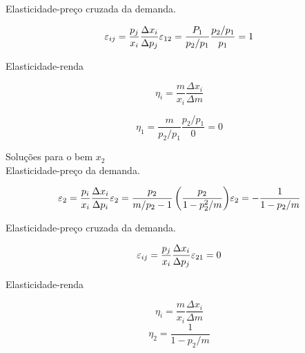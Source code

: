 \documentclass[a4paper, 12pt]{article} %
\begin{document}
\begin{flushleft}
\begin{center}
Elasticidade-preço cruzada da demanda.
\end{center}

\begin{equation}
\varepsilon_{ij} = \dfrac{p_{j}}{x_{i}} \dfrac{\Delta x_{i}}{\Delta p_{j}}
$$\\$$
\varepsilon_{12} = \dfrac{P_{1}}{p_{2}/p_{1}} \dfrac{p_{2}/p_{1}}{p_{1}} = 1
\end{equation}

\begin{center}
Elasticidade-renda 
\end{center}

\begin{equation}
\eta_{i} = \dfrac{m}{x_{i}} \dfrac{\Delta x_{i}}{\Delta m}
\end{equation}

\begin{equation}
\eta_{1} = \dfrac{m}{p_{2}/p_{1}} \dfrac{p_{2}/p_{1}}{0}  = 0
\end{equation}

\begin{center}
	Soluções para o bem $x_{2}$
	\\
	Elasticidade-preço da demanda.
\end{center}

\begin{equation}
\varepsilon_{2} = \dfrac{p_{i}}{x_{i}} \dfrac{ \Delta x_{i}}{\Delta p_{i}}
$$\\$$
\varepsilon_{2} = \dfrac{p_{2}}{m/p_{2}-1} \left( \dfrac{p_{2}}{1-p_{2}^{2}/m} \right)
$$\\$$
\varepsilon_{2} = - \dfrac{1}{1-p_{2}/m}
\end{equation}

\begin{center}
	Elasticidade-preço cruzada da demanda.
\end{center}

\begin{equation}
\varepsilon_{ij} = \dfrac{p_{j}}{x_{i}} \dfrac{\Delta x_{i}}{\Delta p_{j}}
$$\\$$
\varepsilon_{21} = 0
\end{equation}

\begin{center}
	Elasticidade-renda 
\end{center}

\begin{equation}
\eta_{i} = \dfrac{m}{x_{i}} \dfrac{\Delta x_{i}}{\Delta m}
\end{equation}
\begin{equation}
\eta_{2} = \dfrac{1}{1-p_{2}/m}
\end{equation}
\singlespacing


\end{flushleft}
\end{document}
